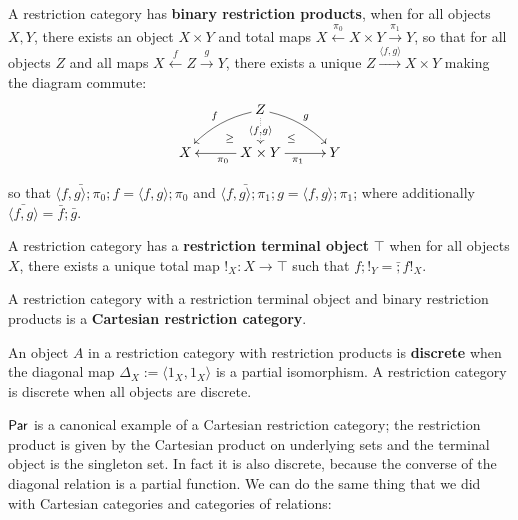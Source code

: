 \begin{definition}
A restriction category has {\bf binary restriction products}, when for all objects  $X,Y$, there exists an object $X\times Y$ and total maps $X \xleftarrow{\pi_0}  X\times Y \xrightarrow{\pi_1} Y$, so that for all objects $Z$ and all maps $X \xleftarrow{f} Z \xrightarrow{g} Y$, there exists a unique $Z\xrightarrow{\langle f,g \rangle} X\times Y$ making the diagram commute:
$$
\xymatrixrowsep{0.2cm}
\xymatrixcolsep{0.4cm}
\xymatrix{
&& Z\ar@{..>}[dd]|-{\langle f, g\rangle} \ar@/_/[ddll]_f \ar@/^/[ddrr]^g &&\\
& \ar@{}[dr]|-{\geq} && \ar@{}[dl] |-{\leq} &\\
X &&  X\times Y \ar[rr]_{\pi_1} \ar[ll]^{\pi_0}  && Y
}
$$

so that $\bar{\langle f, g\rangle ;\pi_0}; f = \langle f, g\rangle ;\pi_0$ and $\bar{\langle f, g\rangle; \pi_1} ;g = \langle f, g\rangle; \pi_1$;
where additionally $\bar{\langle f, g\rangle} =  \bar f ; \bar g$.


A restriction category has a {\bf restriction terminal object} $\top$ when for all objects $X$, there exists a unique total map $!_X:X\to\top$ such that $f ; !_Y = \bar ;  f !_X$.

A restriction category with a restriction terminal object and binary restriction products is a {\bf Cartesian restriction category}.


An object $A$ in a restriction category with restriction products is {\bf discrete} when the diagonal map $\Delta_X:=\langle 1_X, 1_X\rangle$ is a partial isomorphism. A restriction category is discrete when all objects are discrete. 
\end{definition}



$\mathsf{Par}$ is a canonical example of a Cartesian restriction category; the restriction product is given by the Cartesian product on underlying sets and the terminal object is  the singleton set. In fact it is also discrete, because the converse of the diagonal relation is a partial function. We can do the same thing that we did with Cartesian categories and categories of relations:





